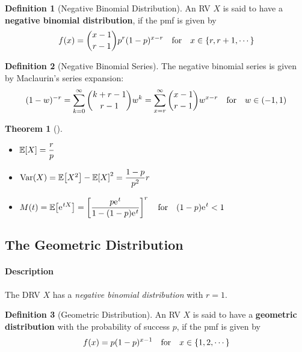 \documentclass[10pt,UTF8]{article}
\newenvironment{definition box}
{\begin{tcolorbox}[colback=blue!5!white,colframe=blue!75!black,parbox=false,before upper=\par,before lower=\par]}
{\end{tcolorbox}}
\newenvironment{theorem box}
{\begin{tcolorbox}[colback=yellow!5!white,colframe=yellow!75!black,parbox=false,before upper=\par,before lower=\par]}
{\end{tcolorbox}}
\theoremstyle{definition}
\newtheorem{definition inner}{Definition}[section]
\newenvironment{definition}[1][]
{\begin{definition box}\begin{definition inner}[#1]\hfill\par}
{\end{definition inner}\end{definition box}}
\theoremstyle{plain}
\newtheorem{theorem inner}{Theorem}[section]
\newenvironment{theorem}[1][]
{\begin{theorem box}\begin{theorem inner}[#1]\hfill\par}
{\end{theorem inner}\end{theorem box}}
\theoremstyle{definition}
\newtheorem*{proof inner}{\textit{Proof}}
\theoremstyle{remark}
\newcommand{\e}{\mathrm{e}{\mkern 1 mu}}
\newcommand{\E}[1]{\mathbb{E}\qty[#1]}  %
\newcommand{\Var}[1]{\mathrm{Var}\qty(#1)}  %
\begin{document}
\begin{definition}[Negative Binomial Distribution]
    An RV $X$ is said to have a \textbf{negative binomial distribution},
    if the pmf is given by
    \begin{equation*}
        f(x) = \binom{x-1}{r-1}p^r (1-p)^{x-r} \qfor x\in\{r,r+1,\cdots\}
    \end{equation*}
\end{definition}


\begin{definition}[Negative Binomial Series]
    The negative binomial series is given by Maclaurin's series expansion:
    \begin{equation*}
        (1-w)^{-r}
        = \sum_{k=0}^{\infty} \binom{k+r-1}{r-1} w^k
        = \sum_{x=r}^{\infty} \binom{x-1}{r-1} w^{x-r}
        \qfor w\in(-1, 1)
    \end{equation*}
\end{definition}

\begin{theorem}
    \begin{itemize}
        \item $\E{X} = \dfrac{r}{p}$
        \item $\Var{X} = \E{X^2} - \E{X}^2 = \dfrac{1-p}{p^2}r$
        \item $\displaystyle
            M(t) = \E{\e^{t X}} = \left[\frac{p \e^t}{1-(1-p)\e^t}\right]^r
            \qfor (1-p)\e^t < 1$
    \end{itemize}
\end{theorem}

\subsection{The Geometric Distribution}

\paragraph{Description}
The DRV $X$ has a \emph{negative binomial distribution} with $r=1$.

\begin{definition}[Geometric Distribution]
    An RV $X$ is said to have a \textbf{geometric distribution} with the probability of success $p$,
    if the pmf is given by
    \begin{equation*}
        f(x) = p(1-p)^{x-1} \qfor x\in\{1,2,\cdots\}
    \end{equation*}
\end{definition}
\end{document}
